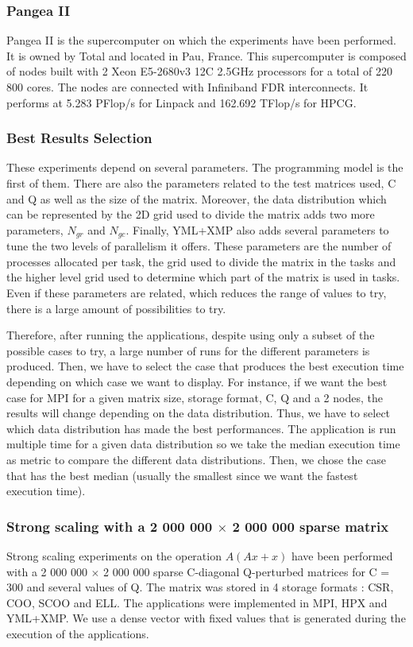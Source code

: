 \subsubsection{Pangea II}
Pangea II is the supercomputer on which the experiments have been performed.
It is owned by Total and located in Pau, France.
This supercomputer is composed of nodes built with 2 Xeon E5-2680v3 12C 2.5GHz processors for a total of 220 800 cores.
The nodes are connected with Infiniband FDR interconnects.
It performs at 5.283 PFlop/s for Linpack and 162.692 TFlop/s for HPCG.

\subsubsection{Best Results Selection}
These experiments depend on several parameters.
The programming model is the first of them.
There are also the parameters related to the test matrices used, C and Q as well as the size of the matrix.
Moreover, the data distribution which can be represented by the 2D grid used to divide the matrix adds two more parameters, $N_{gr}$ and $N_{gc}$.
Finally, YML+XMP also adds several parameters to tune the two levels of parallelism it offers.
These parameters are the number of processes allocated per task, the grid used to divide the matrix in the tasks and the higher level grid used to determine which part of the matrix is used in tasks.
Even if these parameters are related, which reduces the range of values to try, there is a large amount of possibilities to try.

Therefore, after running the applications, despite using only a subset of the possible cases to try, a large number of runs for the different parameters is produced.
Then, we have to select the case that produces the best execution time depending on which case we want to display.
For instance, if we want the best case for MPI for a given matrix size, storage format, C, Q and a 2 nodes, the results will change depending on the data distribution.
Thus, we have to select which data distribution has made the best performances.
The application is run multiple time for a given data distribution so we take the median execution time as metric to compare the different data distributions.
Then, we chose the case that has the best median (usually the smallest since we want the fastest execution time).

\subsubsection{Strong scaling with a 2 000 000 $\times$ 2 000 000 sparse matrix}
Strong scaling experiments on the operation $A(Ax+x)$ have been performed with a 2 000 000 $\times$ 2 000 000 sparse C-diagonal Q-perturbed matrices for C = 300 and several values of Q.
The matrix was stored in 4 storage formats : CSR, COO, SCOO and ELL.
The applications were implemented in MPI, HPX and YML+XMP.
We use a dense vector with fixed values that is generated during the execution of the applications.

